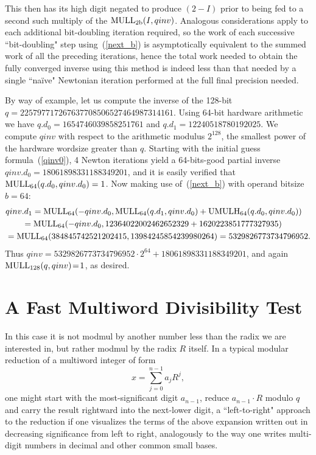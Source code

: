 \documentclass{article}
\begin{document}
This then has its high digit negated to produce $(2 - I)$ prior to being fed to a second such multiply of the ${\rm MULL_{2b}}(I,qinv)$. Analogous considerations apply to each additional bit-doubling iteration required, so the work of each successive ``bit-doubling" step using~(\ref{next_b}) is asymptotically equivalent to the summed work of all the preceding iterations, hence the total work needed to obtain the fully converged inverse using this method is indeed less than that needed by a single ``na\"ive" Newtonian iteration performed at the full final precision needed.

By way of example, let us compute the inverse of the 128-bit $q = 225797717267637708506527464987314161.$  Using 64-bit hardware arithmetic we have $q.d_0 = 1654746039858251761$ and $q.d_1 = 12240518780192025$. We compute $qinv$ with respect to the arithmetic modulus $2^{128}$, the smallest power of the hardware wordsize greater than $q$. Starting with the initial guess formula~(\ref{qinv0}), 4 Newton iterations yield a 64-bits-good partial inverse $qinv.d_0 = 18061898331188349201$, and it is easily verified that ${\rm MULL_{64}}(q.d_0, qinv.d_0) = 1$. Now making use of~(\ref{next_b}) with operand bitsize $b = 64$:
\begin{align}
\nonumber	&qinv.d_1 = {\rm MULL_{64}}(-qinv.d_0, {\rm MULL_{64}}(q.d_1, qinv.d_0) + {\rm UMULH_{64}}(q.d_0, qinv.d_0))	\\
\nonumber	&\qquad = {\rm MULL_{64}}(-qinv.d_0, 12364022002462652329 + 1620223851777327935)		\\
\nonumber	&= {\rm MULL_{64}}(384845742521202415, 13984245854239980264) = 5329826773734796952 .
\end{align}
Thus $qinv\!=\!5329826773734796952\!\cdot\!2^{64}\!+\!18061898331188349201$, and again ${\rm MULL_{128}}(q, qinv)\!=\!1$, as desired.



\section{A Fast Multiword Divisibility Test}
\label{sect:algo_a}

In this case it is not modmul by another number less than the radix we are interested in, but rather modmul by the radix $R$ itself. In a typical modular reduction of a multiword integer of form
\begin{equation}
	x = \sum_{j=0}^{n-1} a_j R^j,
\label{exp_x}
\end{equation}
one might start with the most-significant digit $a_{n-1}$, reduce $a_{n-1} \cdot R$ modulo $q$ and carry the result rightward into the next-lower digit, a ``left-to-right" approach to the reduction if one visualizes the terms of the above expansion written out in decreasing significance from left to right, analogously to the way one writes multi-digit numbers in decimal and other common small bases.
\end{document}
